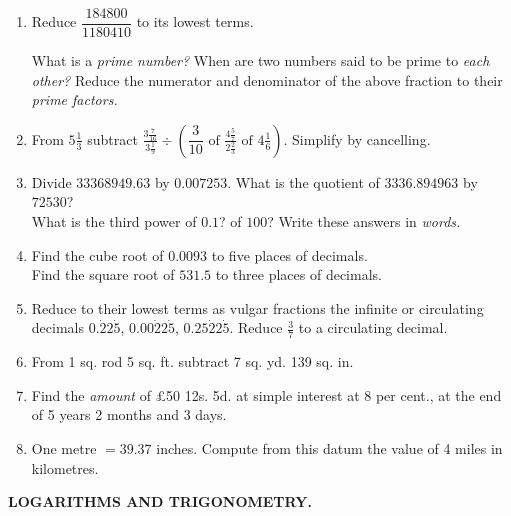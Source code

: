 \documentclass[11pt]{article}
\newcommand\starreditem{\stepcounter{enumi}\item[*\theenumi.]}
\begin{document}
\begin{enumerate}[series=arithmetic, itemindent=-0.2cm]
  \starreditem Reduce $\dfrac{184800}{1180410}$ to its lowest terms.
  
  What is a \textit{prime number?} When are two numbers said to be prime to \textit{each other?} Reduce the numerator and denominator of the above fraction to their \textit{prime factors.} \vfill

  \starreditem From $5\frac{1}{3}$ subtract $\frac{3\frac{7}{16}}{3\frac{1}{9}} \div \left(\dfrac{3}{10} \text{~of~} \frac{4\frac57}{2\frac23} \text{~of~} 4\frac16\right)$. Simplify by cancelling. \vfill

  \starreditem Divide $33368949.63$ by $0.007253$. What is the quotient of $3336.894963$ by $72530$? \\ What is the third power of $0.1$? of $100$? Write these answers in \textit{words.} \vfill

  \item Find the cube root of $0.0093$ to five places of decimals. \\ Find the square root of $531.5$ to three places of decimals. \vfill

  \item Reduce to their lowest terms as vulgar fractions the infinite or circulating decimals $0.\dot{2}2\dot5$, $0.00\dot{2}2\dot5$, $0.25\dot{2}2\dot5$. Reduce $\frac{3}{7}$ to a circulating decimal. \vfill

  \starreditem From 1 sq. rod 5 sq. ft. subtract 7 sq. yd. 139 sq. in. \vfill

  \item Find the \textit{amount} of \pounds50 12s. 5d. at simple interest at 8 per cent., at the end of 5 years 2 months and 3 days. \vfill

  \item One metre $=39.37$ inches. Compute from this datum the value of 4 miles in kilometres. \vfill
\end{enumerate}

\begin{center}
    \uppercase{\textbf{\large{Logarithms and Trigonometry.}}}
\end{center}
\end{document}
